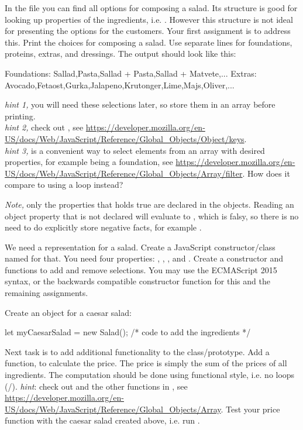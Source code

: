 \documentclass[fleqn, article, a4paper]{memoir}
\begin{document}
\begin{Assignments}
\item In the  file you can find all options for composing a salad. Its structure is good for looking up properties of the ingredients, i.e. . However this structure is not ideal for presenting the options for the customers. Your first assignment is to address this. Print the choices for composing a salad. Use separate lines for foundations, proteins, extras, and dressings. The output should look like this:
\begin{Code}
Foundations: Sallad,Pasta,Sallad + Pasta,Sallad + Matvete,...
Extras: Avocado,Fetaost,Gurka,Jalapeno,Krutonger,Lime,Majs,Oliver,...
\end{Code}
\emph{hint 1, } you will need these selections later, so store them in an array before printing.
\\ \noindent
\emph{hint 2, } check out , see \url{https://developer.mozilla.org/en-US/docs/Web/JavaScript/Reference/Global_Objects/Object/keys}. \\ \noindent
\emph{hint 3, }  is a convenient way to select elements from an array with desired properties, for example being a foundation, see \url{https://developer.mozilla.org/en-US/docs/Web/JavaScript/Reference/Global_Objects/Array/filter}. 
How does it compare to using a  loop instead?

\noindent \emph{Note,} only the properties that holds true are declared in the objects. Reading an object property that is not declared will evaluate to , which is falsy, so there is no need to do explicitly store negative facts, for example .

\item We need a representation for a salad. Create a JavaScript constructor/class named  for that. You need four properties: , , , and . Create a constructor and functions to add and remove selections. You may use the ECMAScript 2015  syntax, or the backwards compatible constructor function for this and the remaining assignments.

\item Create an object for a caesar salad:
\begin{Code}
let myCaesarSalad = new Salad();
/* code to add the ingredients */
\end{Code}
\item Next task is to add additional functionality to the  class/prototype. Add a function,  to calculate the price. The price is simply the sum of the prices of all ingredients. The computation should be done using functional style, i.e. no loops (/). \emph{hint}: check out  and the other functions in , see \url{https://developer.mozilla.org/en-US/docs/Web/JavaScript/Reference/Global_Objects/Array}. Test your price function with the caesar salad created above, i.e. run .


\end{Assignments}
\end{document}
